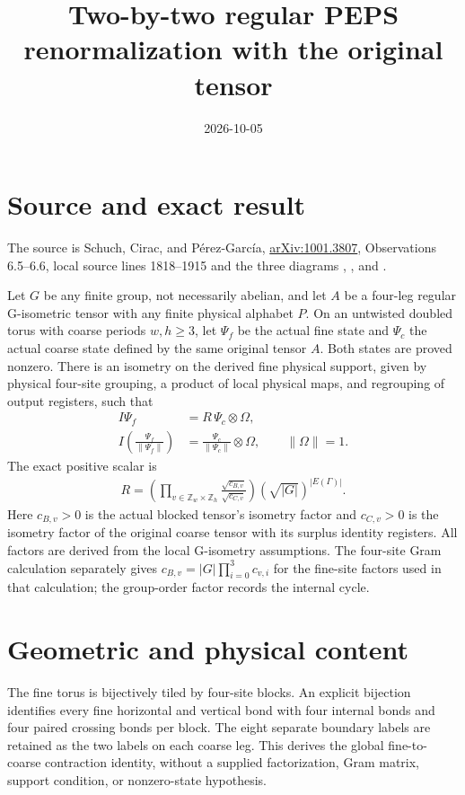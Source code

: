 \documentclass{article}
\title{Two-by-two regular PEPS renormalization with the original tensor}
\author{}
\date{2026-10-05}
\begin{document}
\maketitle
{}

\section{Source and exact result}
The source is Schuch, Cirac, and P\'erez-Garc\'ia,
\href{https://arxiv.org/abs/1001.3807}{arXiv:1001.3807},
Observations 6.5--6.6, local source lines 1818--1915 and the three diagrams
,
, and
.

Let $G$ be any finite group, not necessarily abelian, and let $A$ be a
four-leg regular G-isometric tensor with any finite physical alphabet $P$.
On an untwisted doubled torus with coarse periods $w,h\geq3$, let $\Psi_f$
be the actual fine state and $\Psi_c$ the actual coarse state defined by
the same original tensor $A$. Both states are proved nonzero. There is an
isometry on the derived fine physical support, given by physical four-site
grouping, a product of local physical maps, and regrouping of output
registers, such that
\begin{align}
    I\Psi_f & =R\,\Psi_c\otimes\Omega,                 \\
    I\left(\frac{\Psi_f}{\|\Psi_f\|}\right)
            & =\frac{\Psi_c}{\|\Psi_c\|}\otimes\Omega,
    \qquad \|\Omega\|=1.
\end{align}
The exact positive scalar is
\begin{align}
    R=\left(\prod_{v\in\mathbb Z_w\times\mathbb Z_h}
    \frac{\sqrt{c_{B,v}}}{\sqrt{c_{C,v}}}\right)
    (\sqrt{|G|})^{|E(\Gamma)|}.
\end{align}
Here $c_{B,v}>0$ is the actual blocked tensor's isometry factor and
$c_{C,v}>0$ is the isometry factor of the original coarse tensor with its
surplus identity registers. All factors are derived from the local
G-isometry assumptions. The four-site Gram calculation separately gives
$c_{B,v}=|G|\prod_{i=0}^3c_{v,i}$ for the fine-site factors used in that
calculation; the group-order factor records the internal cycle.

\section{Geometric and physical content}
The fine torus is bijectively tiled by four-site blocks. An explicit
bijection identifies every fine horizontal and vertical bond with four
internal bonds and four paired crossing bonds per block. The eight separate
boundary labels are retained as the two labels on each coarse leg.
This derives the global fine-to-coarse contraction identity, without a
supplied factorization, Gram matrix, support condition, or nonzero-state
hypothesis.
\end{document}
